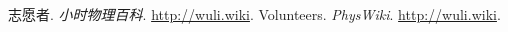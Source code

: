 \begin{thebibliography}{99}
志愿者. \textsl{小时物理百科}. \href{http://wuli.wiki}{http://wuli.wiki}. 
Volunteers. \textsl{PhysWiki}. \href{http://wuli.wiki}{http://wuli.wiki}. 
\end{thebibliography}
